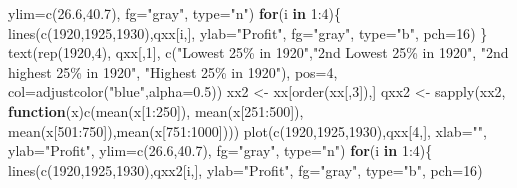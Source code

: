 \documentclass[
  10pt,
  b5paper]{book}
\newenvironment{Shaded}{\begin{snugshade}}{\end{snugshade}}
\newcommand{\AttributeTok}[1]{\textcolor[rgb]{0.77,0.63,0.00}{#1}}
\newcommand{\ControlFlowTok}[1]{\textcolor[rgb]{0.13,0.29,0.53}{\textbf{#1}}}
\newcommand{\DecValTok}[1]{\textcolor[rgb]{0.00,0.00,0.81}{#1}}
\newcommand{\FloatTok}[1]{\textcolor[rgb]{0.00,0.00,0.81}{#1}}
\newcommand{\FunctionTok}[1]{\textcolor[rgb]{0.00,0.00,0.00}{#1}}
\newcommand{\NormalTok}[1]{#1}
\newcommand{\OtherTok}[1]{\textcolor[rgb]{0.56,0.35,0.01}{#1}}
\newcommand{\SpecialCharTok}[1]{\textcolor[rgb]{0.00,0.00,0.00}{#1}}
\newcommand{\StringTok}[1]{\textcolor[rgb]{0.31,0.60,0.02}{#1}}
\begin{document}
\begin{Shaded}
\begin{Highlighting}[]
     \AttributeTok{ylim=}\FunctionTok{c}\NormalTok{(}\FloatTok{26.6}\NormalTok{,}\FloatTok{40.7}\NormalTok{), }\AttributeTok{fg=}\StringTok{"gray"}\NormalTok{, }\AttributeTok{type=}\StringTok{"n"}\NormalTok{) }
\ControlFlowTok{for}\NormalTok{(i }\ControlFlowTok{in} \DecValTok{1}\SpecialCharTok{:}\DecValTok{4}\NormalTok{)\{}
\FunctionTok{lines}\NormalTok{(}\FunctionTok{c}\NormalTok{(}\DecValTok{1920}\NormalTok{,}\DecValTok{1925}\NormalTok{,}\DecValTok{1930}\NormalTok{),qxx[i,], }\AttributeTok{ylab=}\StringTok{"Profit"}\NormalTok{, }\AttributeTok{fg=}\StringTok{"gray"}\NormalTok{, }\AttributeTok{type=}\StringTok{"b"}\NormalTok{, }\AttributeTok{pch=}\DecValTok{16}\NormalTok{) }
\NormalTok{\}}
\FunctionTok{text}\NormalTok{(}\FunctionTok{rep}\NormalTok{(}\DecValTok{1920}\NormalTok{,}\DecValTok{4}\NormalTok{), qxx[,}\DecValTok{1}\NormalTok{], }\FunctionTok{c}\NormalTok{(}\StringTok{"Lowest 25\% in 1920"}\NormalTok{,}\StringTok{"2nd Lowest 25\% in 1920"}\NormalTok{,}
                             \StringTok{"2nd highest 25\% in 1920"}\NormalTok{, }\StringTok{"Highest 25\% in 1920"}\NormalTok{),}
     \AttributeTok{pos=}\DecValTok{4}\NormalTok{, }\AttributeTok{col=}\FunctionTok{adjustcolor}\NormalTok{(}\StringTok{"blue"}\NormalTok{,}\AttributeTok{alpha=}\FloatTok{0.5}\NormalTok{))  }
\NormalTok{xx2 }\OtherTok{\textless{}{-}}\NormalTok{ xx[}\FunctionTok{order}\NormalTok{(xx[,}\DecValTok{3}\NormalTok{]),]}
\NormalTok{qxx2 }\OtherTok{\textless{}{-}} \FunctionTok{sapply}\NormalTok{(xx2, }\ControlFlowTok{function}\NormalTok{(x)}\FunctionTok{c}\NormalTok{(}\FunctionTok{mean}\NormalTok{(x[}\DecValTok{1}\SpecialCharTok{:}\DecValTok{250}\NormalTok{]), }\FunctionTok{mean}\NormalTok{(x[}\DecValTok{251}\SpecialCharTok{:}\DecValTok{500}\NormalTok{]),}
 \FunctionTok{mean}\NormalTok{(x[}\DecValTok{501}\SpecialCharTok{:}\DecValTok{750}\NormalTok{]),}\FunctionTok{mean}\NormalTok{(x[}\DecValTok{751}\SpecialCharTok{:}\DecValTok{1000}\NormalTok{])))}
\FunctionTok{plot}\NormalTok{(}\FunctionTok{c}\NormalTok{(}\DecValTok{1920}\NormalTok{,}\DecValTok{1925}\NormalTok{,}\DecValTok{1930}\NormalTok{),qxx[}\DecValTok{4}\NormalTok{,], }\AttributeTok{xlab=}\StringTok{""}\NormalTok{, }\AttributeTok{ylab=}\StringTok{"Profit"}\NormalTok{, }
     \AttributeTok{ylim=}\FunctionTok{c}\NormalTok{(}\FloatTok{26.6}\NormalTok{,}\FloatTok{40.7}\NormalTok{), }\AttributeTok{fg=}\StringTok{"gray"}\NormalTok{, }\AttributeTok{type=}\StringTok{"n"}\NormalTok{) }
\ControlFlowTok{for}\NormalTok{(i }\ControlFlowTok{in} \DecValTok{1}\SpecialCharTok{:}\DecValTok{4}\NormalTok{)\{}
\FunctionTok{lines}\NormalTok{(}\FunctionTok{c}\NormalTok{(}\DecValTok{1920}\NormalTok{,}\DecValTok{1925}\NormalTok{,}\DecValTok{1930}\NormalTok{),qxx2[i,], }\AttributeTok{ylab=}\StringTok{"Profit"}\NormalTok{, }\AttributeTok{fg=}\StringTok{"gray"}\NormalTok{, }\AttributeTok{type=}\StringTok{"b"}\NormalTok{, }\AttributeTok{pch=}\DecValTok{16}\NormalTok{) }

\end{Highlighting}
\end{Shaded}
\end{document}
